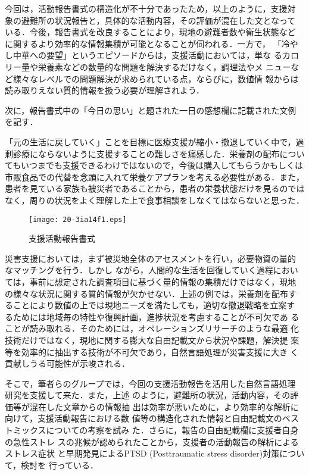 \documentclass[japanese]{jnlp_1.4}
\begin{document}
\vspace{1\Cvs}
今回は，活動報告書式の構造化が不十分であったため，以上のように，支援対
象の避難所の状況報告と，具体的な活動内容，その評価が混在した文となって
いる．今後，報告書式を改良することにより，現地の避難者数や衛生状態など
に関するより効率的な情報集積が可能となることが伺われる．一方で，
「冷やし中華への要望」というエピソードからは，支援活動においては，単な
るカロリー量や栄養素などの数量的な問題を解決するだけなく，調理法やメ
ニューなど様々なレベルでの問題解決が求められている点，ならびに，数値情
報からは読み取りえない質的情報を扱う必要が理解されよう．

次に，報告書式中の「今日の思い」と題された一日の感想欄に記載された文例
を記す．

\vspace{1\Cvs}
\begin{screen}
「元の生活に戻していく」ことを目標に医療支援が縮小・撤退していく中で，過剰診療にならないように支援することの難しさを痛感した．栄養剤の配布についてもいつまでも支援できるわけではないので，今後は購入してもらうかもしくは市販食品での代替を念頭に入れて栄養ケアプランを考える必要性がある．また，患者を見ている家族も被災者であることから，患者の栄養状態だけを見るのではなく，周りの状況をよく理解した上で食事相談をしなくてはならないと思った．
\end{screen}


\begin{figure}[t]
\begin{center}
\texttt{[image: 20-3ia14f1.eps]}
\end{center}
\caption{支援活動報告書式}
\label{fig:report}
\end{figure}

\vspace{1\Cvs}
災害支援においては，まず被災地全体のアセスメントを行い，必要物資の量的
なマッチングを行う．しかし
ながら，人間的な生活を回復していく過程におい
ては，事前に想定された調査項目に基づく量的情報の集積だけではなく，現地
の様々な状況に関する質的情報が欠かせない．上述の例では，栄養剤を配布す
ることにより数値の上では現地ニーズを満たしても，適切な撤退戦略を立案す
るためには地域毎の特性や復興計画，進捗状況を考慮することが不可欠であ
ることが読み取れる．そのためには，オペレーションズリサーチのような最適
化技術だけではなく，現地に関する膨大な自由記載文から状況や課題，解決提
案等を効率的に抽出する技術が不可欠であり，自然言語処理が災害支援に大き
く貢献しうる可能性が示唆される．

そこで，筆者らのグループでは，今回の支援活動報告を活用した自然言語処理
研究を支援して来た\cite{okazaki2012,aramaki2012,kazama2012}．また，上述
のように，避難所の状況，活動内容，その評価等が混在した文章からの情報抽
出は効率が悪いために，より効率的な解析に向けて，支援活動報告における数
値等の構造化された情報と自由記載文のベストミックスについての考察を試み
た\cite{okumura2012}．さらに，報告の自由記載欄に支援者自身の急性ストレ
スの兆候が認められたことから，支援者の活動報告の解析によるストレス症状
と早期発見によるPTSD (Posttraumatic stress disorder)対策について，検討を
行っている．
\end{document}

